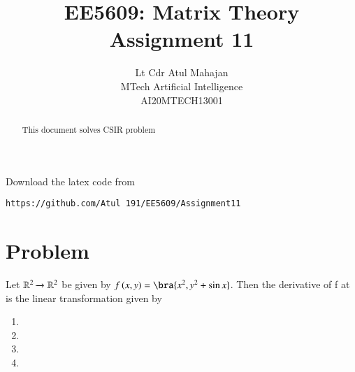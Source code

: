 \documentclass[journal,12pt,twocolumn]{IEEEtran}
\begin{document}
\def\putbox#1#2#3{\makebox[0in][l]{\makebox[#1][l]{}\raisebox{\baselineskip}[0in][0in]{\raisebox{#2}[0in][0in]{#3}}}}
     \def\rightbox#1{\makebox[0in][r]{#1}}
     \def\centbox#1{\makebox[0in]{#1}}
     \def\topbox#1{\raisebox{-\baselineskip}[0in][0in]{#1}}
     \def\midbox#1{\raisebox{-0.5\baselineskip}[0in][0in]{#1}}
\vspace{3cm}
\title{EE5609: Matrix Theory\\
          Assignment 11\\}
\author{Lt Cdr Atul Mahajan\\MTech Artificial Intelligence\\AI20MTECH13001 }
\maketitle
\newpage
\bigskip
\renewcommand{\thefigure}{\theenumi}
\renewcommand{\thetable}{\theenumi}
\begin{abstract}
This  document solves CSIR problem
\end{abstract}
Download the latex code from 
%
%
%
\begin{lstlisting}
https://github.com/Atul 191/EE5609/Assignment11
\end{lstlisting}
%
\section{\textbf{Problem}}
Let $\mathbb{R}^2\xrightarrow{}\mathbb{R}^2$ be given by $f\brak{x,y}= \bra{x^2,y^2+\sin x}$. Then the derivative of f at  is the linear transformation given by
\begin{enumerate}
    \item {}
    \item {}
    \item {}
    \item {}
\end{enumerate}
\end{document}
